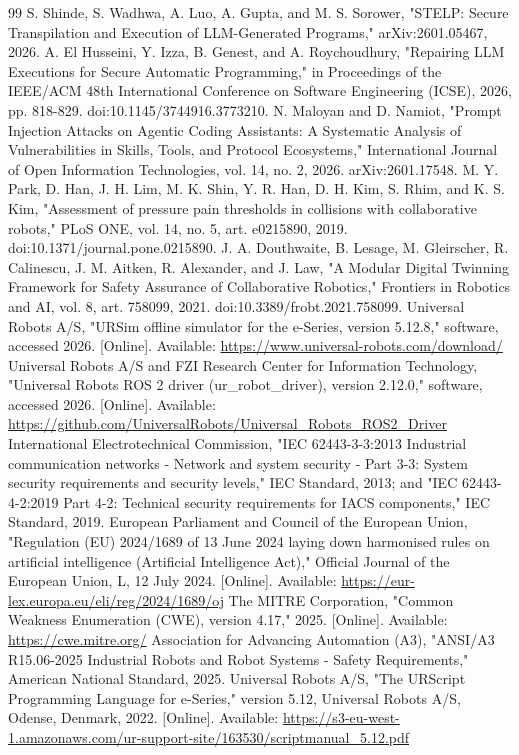 \documentclass{ieeeaccess}
\begin{document}
\begin{thebibliography}{99}
 S. Shinde, S. Wadhwa, A. Luo, A. Gupta, and M. S. Sorower, "STELP: Secure Transpilation and Execution of LLM-Generated Programs," arXiv:2601.05467, 2026.
 A. El Husseini, Y. Izza, B. Genest, and A. Roychoudhury, "Repairing LLM Executions for Secure Automatic Programming," in Proceedings of the IEEE/ACM 48th International Conference on Software Engineering (ICSE), 2026, pp. 818-829. doi:10.1145/3744916.3773210.
 N. Maloyan and D. Namiot, "Prompt Injection Attacks on Agentic Coding Assistants: A Systematic Analysis of Vulnerabilities in Skills, Tools, and Protocol Ecosystems," International Journal of Open Information Technologies, vol. 14, no. 2, 2026. arXiv:2601.17548.
 M. Y. Park, D. Han, J. H. Lim, M. K. Shin, Y. R. Han, D. H. Kim, S. Rhim, and K. S. Kim, "Assessment of pressure pain thresholds in collisions with collaborative robots," PLoS ONE, vol. 14, no. 5, art. e0215890, 2019. doi:10.1371/journal.pone.0215890.
 J. A. Douthwaite, B. Lesage, M. Gleirscher, R. Calinescu, J. M. Aitken, R. Alexander, and J. Law, "A Modular Digital Twinning Framework for Safety Assurance of Collaborative Robotics," Frontiers in Robotics and AI, vol. 8, art. 758099, 2021. doi:10.3389/frobt.2021.758099.
 Universal Robots A/S, "URSim offline simulator for the e-Series, version 5.12.8," software, accessed 2026. [Online]. Available: \url{https://www.universal-robots.com/download/}
 Universal Robots A/S and FZI Research Center for Information Technology, "Universal Robots ROS 2 driver (ur\_robot\_driver), version 2.12.0," software, accessed 2026. [Online]. Available: \url{https://github.com/UniversalRobots/Universal_Robots_ROS2_Driver}
 International Electrotechnical Commission, "IEC 62443-3-3:2013 Industrial communication networks - Network and system security - Part 3-3: System security requirements and security levels," IEC Standard, 2013; and "IEC 62443-4-2:2019 Part 4-2: Technical security requirements for IACS components," IEC Standard, 2019.
 European Parliament and Council of the European Union, "Regulation (EU) 2024/1689 of 13 June 2024 laying down harmonised rules on artificial intelligence (Artificial Intelligence Act)," Official Journal of the European Union, L, 12 July 2024. [Online]. Available: \url{https://eur-lex.europa.eu/eli/reg/2024/1689/oj}
 The MITRE Corporation, "Common Weakness Enumeration (CWE), version 4.17," 2025. [Online]. Available: \url{https://cwe.mitre.org/}
 Association for Advancing Automation (A3), "ANSI/A3 R15.06-2025 Industrial Robots and Robot Systems - Safety Requirements," American National Standard, 2025.
 Universal Robots A/S, "The URScript Programming Language for e-Series," version 5.12, Universal Robots A/S, Odense, Denmark, 2022. [Online]. Available: \url{https://s3-eu-west-1.amazonaws.com/ur-support-site/163530/scriptmanual_5.12.pdf}
\end{thebibliography}
\end{document}
